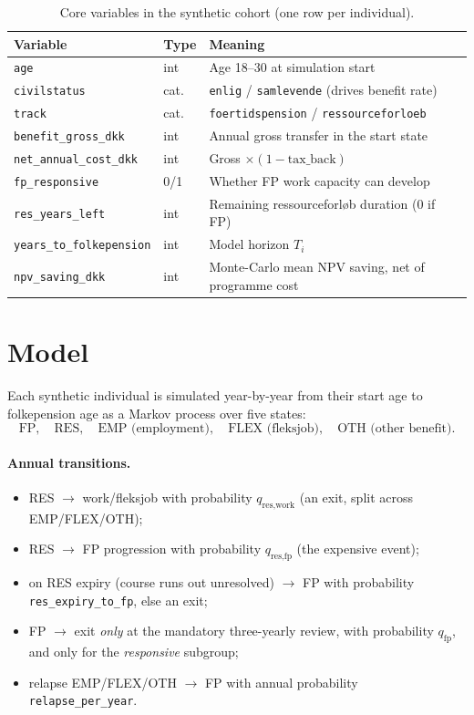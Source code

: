 \documentclass[11pt,a4paper]{article}
\begin{document}
\begin{table}[H]
\centering
\caption{Core variables in the synthetic cohort (one row per individual).}
\label{tab:vars}
\small
\begin{tabular}{@{}lll@{}}
\toprule
Variable & Type & Meaning \\
\midrule
\texttt{age} & int & Age 18--30 at simulation start \\
\texttt{civilstatus} & cat. & \texttt{enlig} / \texttt{samlevende} (drives benefit rate) \\
\texttt{track} & cat. & \texttt{foertidspension} / \texttt{ressourceforloeb} \\
\texttt{benefit\_gross\_dkk} & int & Annual gross transfer in the start state \\
\texttt{net\_annual\_cost\_dkk} & int & Gross $\times (1-\text{tax\_back})$ \\
\texttt{fp\_responsive} & 0/1 & Whether FP work capacity can develop \\
\texttt{res\_years\_left} & int & Remaining ressourceforl\o b duration (0 if FP) \\
\texttt{years\_to\_folkepension} & int & Model horizon $T_i$ \\
\texttt{npv\_saving\_dkk} & int & Monte-Carlo mean NPV saving, net of programme cost \\
\bottomrule
\end{tabular}
\end{table}

\section{Model}
Each synthetic individual is simulated year-by-year from their start age to
folkepension age as a Markov process over five states:
\[
\text{FP},\quad \text{RES},\quad \text{EMP (employment)},\quad
\text{FLEX (fleksjob)},\quad \text{OTH (other benefit)}.
\]

\paragraph{Annual transitions.}
\begin{itemize}[nosep]
  \item RES $\to$ work/fleksjob with probability $q_{\text{res,work}}$ (an exit,
        split across EMP/FLEX/OTH);
  \item RES $\to$ FP progression with probability $q_{\text{res,fp}}$ (the
        expensive event);
  \item on RES expiry (course runs out unresolved) $\to$ FP with probability
        \texttt{res\_expiry\_to\_fp}, else an exit;
  \item FP $\to$ exit \emph{only} at the mandatory three-yearly review, with
        probability $q_{\text{fp}}$, and only for the \emph{responsive}
        subgroup;
  \item relapse EMP/FLEX/OTH $\to$ FP with annual probability
        \texttt{relapse\_per\_year}.
\end{itemize}
\end{document}
